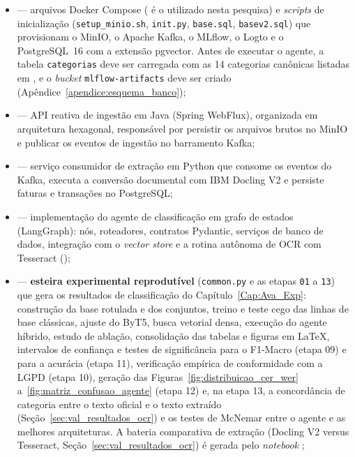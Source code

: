 \begin{apendicesenv}
\begin{itemize}
	\item {} --- arquivos Docker Compose ( é o utilizado nesta pesquisa) e \textit{scripts} de inicialização (\texttt{setup\_minio.sh}, \texttt{init.py}, \texttt{base.sql}, \texttt{basev2.sql}) que provisionam o MinIO, o Apache Kafka, o MLflow, o Logto e o PostgreSQL~16 com a extensão pgvector. Antes de executar o agente, a tabela \texttt{categorias} deve ser carregada com as 14 categorias canônicas listadas em , e o \textit{bucket} \texttt{mlflow-artifacts} deve ser criado (Apêndice~\ref{apendice:esquema_banco});
	\item {} --- API reativa de ingestão em Java (Spring WebFlux), organizada em arquitetura hexagonal, responsável por persistir os arquivos brutos no MinIO e publicar os eventos de ingestão no barramento Kafka;
	\item {} --- serviço consumidor de extração em Python que consome os eventos do Kafka, executa a conversão documental com IBM Docling V2 e persiste faturas e transações no PostgreSQL;
	\item {} --- implementação do agente de classificação em grafo de estados (LangGraph): nós, roteadores, contratos Pydantic, serviços de banco de dados, integração com o \textit{vector store} e a rotina autônoma de OCR com Tesseract ();
	\item {} --- \textbf{esteira experimental reprodutível} (\texttt{common.py} e as etapas \texttt{01} a \texttt{13}) que gera os resultados de classificação do Capítulo~\ref{Cap:Ava_Exp}: construção da base rotulada e dos conjuntos, treino e teste cego das linhas de base clássicas, ajuste do ByT5, busca vetorial densa, execução do agente híbrido, estudo de ablação, consolidação das tabelas e figuras em \LaTeX, intervalos de confiança e testes de significância para o F1-Macro (etapa 09) e para a acurácia (etapa 11), verificação empírica de conformidade com a LGPD (etapa 10), geração das Figuras~\ref{fig:distribuicao_cer_wer} a~\ref{fig:matriz_confusao_agente} (etapa 12) e, na etapa 13, a concordância de categoria entre o texto oficial e o texto extraído (Seção~\ref{sec:val_resultados_ocr}) e os testes de McNemar entre o agente e as melhores arquiteturas. A bateria comparativa de extração (Docling V2 versus Tesseract, Seção~\ref{sec:val_resultados_ocr}) é gerada pelo \textit{notebook} ;

\end{itemize}
\end{apendicesenv}
